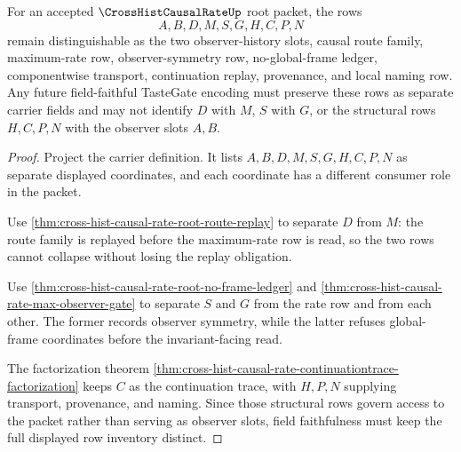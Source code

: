 \begin{theorem}
\label{thm:cross-hist-causal-rate-root-route-family-field-faithfulness}
For an accepted $\CrossHistCausalRateUp$ root packet, the rows
$$
A,B,D,M,S,G,H,C,P,N
$$
remain distinguishable as the two observer-history slots, causal route family, maximum-rate row, observer-symmetry row, no-global-frame ledger, componentwise transport, continuation replay, provenance, and local naming row. Any future field-faithful TasteGate encoding must preserve these rows as separate carrier fields and may not identify $D$ with $M$, $S$ with $G$, or the structural rows $H,C,P,N$ with the observer slots $A,B$.
\end{theorem}
\begin{proof}
Project the carrier definition. It lists $A,B,D,M,S,G,H,C,P,N$ as separate displayed coordinates, and each coordinate has a different consumer role in the packet.

Use \autoref{thm:cross-hist-causal-rate-root-route-replay} to separate $D$ from $M$: the route family is replayed before the maximum-rate row is read, so the two rows cannot collapse without losing the replay obligation.

Use \autoref{thm:cross-hist-causal-rate-root-no-frame-ledger} and \autoref{thm:cross-hist-causal-rate-max-observer-gate} to separate $S$ and $G$ from the rate row and from each other. The former records observer symmetry, while the latter refuses global-frame coordinates before the invariant-facing read.

The factorization theorem \autoref{thm:cross-hist-causal-rate-continuationtrace-factorization} keeps $C$ as the continuation trace, with $H,P,N$ supplying transport, provenance, and naming. Since those structural rows govern access to the packet rather than serving as observer slots, field faithfulness must keep the full displayed row inventory distinct.
\end{proof}

